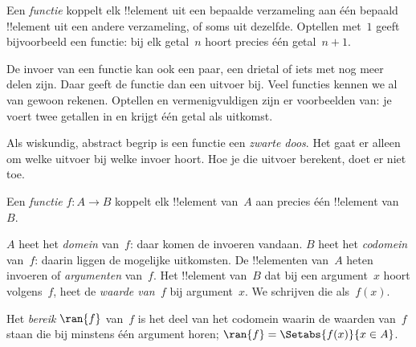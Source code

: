 \documentclass[openany]{memoir}
\begin{document}
\endgroup

\begingroup
\def\olfilename{OLP-0021}
\def\olfilepath{content/sets-functions-relations/functions/}
\hypertarget{unit-OLP-0021}{}




\begin{explain}
Een \emph{functie} koppelt elk !!{element} uit een bepaalde verzameling aan
één bepaald !!{element} uit een andere verzameling, of soms uit dezelfde.
Optellen met~$1$ geeft bijvoorbeeld een functie: bij elk getal~$n$ hoort
precies één getal~$n+1$.
  
De invoer van een functie kan ook een paar, een drietal of iets met nog meer
delen zijn. Daar geeft de functie dan een uitvoer bij. Veel functies kennen we
al van gewoon rekenen.
Optellen en vermenigvuldigen zijn er voorbeelden van: je voert twee getallen
in en krijgt één getal als uitkomst.

Als wiskundig, abstract begrip is een functie een \emph{zwarte doos}. Het gaat
er alleen om welke uitvoer bij welke invoer hoort. Hoe je die uitvoer berekent,
doet er niet toe.
\end{explain}

\begin{defn}[Functie]
Een \emph{functie} $f \colon A \to B$ koppelt elk !!{element} van~$A$ aan
precies één !!{element} van~$B$.

$A$ heet het \emph{domein} van~$f$: daar komen de invoeren vandaan. $B$ heet
het \emph{codomein} van~$f$: daarin liggen de mogelijke uitkomsten. De
!!{element}en van~$A$ heten invoeren of \emph{argumenten}
van~$f$. Het !!{element} van~$B$ dat bij een argument~$x$ hoort volgens~$f$,
heet de \emph{waarde van~$f$} bij argument~$x$. We schrijven die als~$f(x)$.

Het \emph{bereik} $\ran{f}$ van~$f$ is het deel van het codomein waarin de
waarden van~$f$ staan die bij minstens één argument horen; $\ran{f} =
\Setabs{f(x)}{x \in A}$.
\end{defn}
\end{document}
